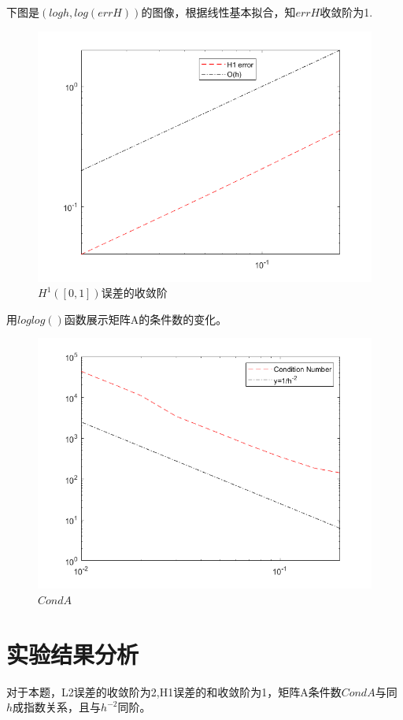 \documentclass{article}
\begin{document}
\newpage
下图是$(logh,log(errH))$的图像，根据线性基本拟合，知$errH$收敛阶为1.
\begin{figure}[H]
\centering
\includegraphics[scale=0.5]{errH1.png}
\caption{\label{H1_err}$H^{1}([0,1])$误差的收敛阶}
\end{figure}



用$loglog()$函数展示矩阵A的条件数的变化。
\begin{figure}[H]
\centering
\includegraphics[scale=0.5]{CondA.png}
\caption{\label{CondA}$CondA$}
\end{figure}


\section{实验结果分析}
对于本题，L2误差的收敛阶为2,H1误差的和收敛阶为1，矩阵A条件数$CondA$与同$h$成指数关系，且与$h^{-2}$同阶。
\end{document}
